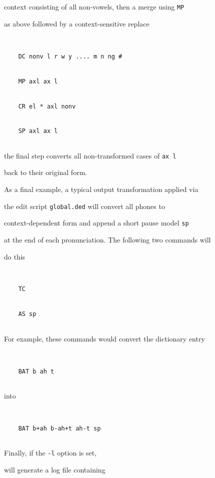 context consisting of all non-vowels, then a merge using  \texttt{MP}


as above followed by a context-sensitive replace


\begin{verbatim}


    DC nonv l r w y .... m n ng #


    MP axl ax l


    CR el * axl nonv


    SP axl ax l


\end{verbatim}


the final step converts all non-transformed cases of \texttt{ax l}


back to their original form.





As a final example, a typical output transformation applied via


the edit script \texttt{global.ded} will convert all phones to


context-dependent form and append a short pause model \texttt{sp}


at the end of each pronunciation.  The following two commands will


do this


\begin{verbatim}


    TC


    AS sp


\end{verbatim}


For example, these commands would convert the dictionary entry


\begin{verbatim}


    BAT b ah t


\end{verbatim}


into


\begin{verbatim}


    BAT b+ah b-ah+t ah-t sp


\end{verbatim}





Finally, if the \texttt{-l} option is set, 


 will generate a log file containing



